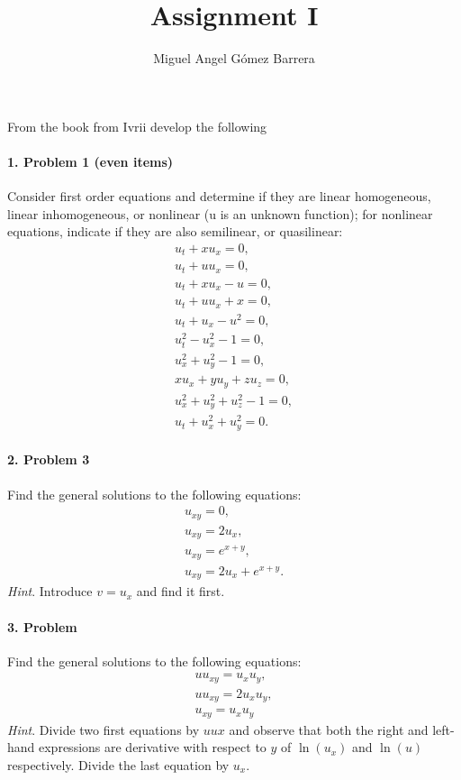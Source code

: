\documentclass{article}
\title{Assignment I}
\author{Miguel Angel Gómez Barrera}
\begin{document}
	\maketitle
\paragraph{} From the book from Ivrii develop the following
\paragraph{1. Problem 1 (even items)}Consider first order equations and determine if they are linear homogeneous, linear inhomogeneous, or nonlinear (u is an unknown function); for nonlinear equations, indicate if they are also semilinear, or quasilinear:
\begin{gather}
u_t+xu_x= 0,\\[2pt]
u_t+uu_x= 0,\\[2pt]
u_t+xu_x- u=0,\\[2pt]
u_t+u u_x+x=0,\\[2pt]
u_t + u_x -u^2=0,\\[2pt]
u_t^2-u_x^2-1=0,\\[2pt]
u_x^2+u_y^2-1=0,\\[2pt]
x u_x + y u_y+ zu_z=0,\\[2pt]
u_x^2 +  u_y^2+ u_z^2-1=0,\\[2pt]
u_t + u_x^2+u_y^2=0.
\end{gather} 
\paragraph{2. Problem 3} Find the general solutions to the following equations:
\begin{gather}
u_{xy}=0,\\[2pt]
u_{xy}= 2u_x,\\[2pt]
u_{xy}=e^{x+y},\\[2pt]
u_{xy}= 2u_x+e^{x+y}.
\end{gather}
\textit{Hint}. Introduce $v=u_x$ and find it first.
\paragraph{3. Problem} Find the general solutions to the following equations: 
\begin{gather}
u u_{xy}=u_xu_y,\\[2pt]
u u_{xy}= 2u_xu_y,\\[2pt]
u_{xy}=u_x u_y
\end{gather}
\textit{Hint}. Divide two first equations by $uux$ and observe that both the right and left-hand expressions are derivative with respect to $y$ of $\ln (u_x)$ and $\ln (u)$ respectively. Divide the last equation by $u_x$.
\end{document}
